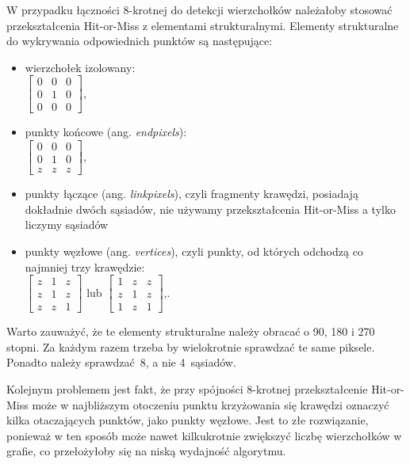 \documentclass[a4paper,11pt,twoside,openright]{report}
\theoremstyle{definition}
\begin{document}
W przypadku łączności 8-krotnej do detekcji wierzchołków należałoby stosować
przekształcenia Hit-or-Miss z elementami strukturalnymi. Elementy strukturalne
do wykrywania odpowiednich punktów są następujące:

\begin{itemize}%
\item wierzchołek izolowany: \\
$
\begin{bmatrix}
0 & 0 & 0 \\
0 & 1 & 0 \\
0 & 0 & 0
\end{bmatrix}
$,
\item punkty końcowe (ang. \textit{endpixels}): \\
$
\begin{bmatrix}
0 & 0 & 0 \\
0 & 1 & 0 \\
z & z & z
\end{bmatrix}
$,
\item punkty łączące (ang. \textit{linkpixels}), czyli fragmenty krawędzi, posiadają
dokładnie dwóch sąsiadów, nie używamy przekształcenia Hit-or-Miss a tylko liczymy sąsiadów
\item punkty węzłowe (ang. \textit{vertices}), czyli punkty, od których odchodzą co najmniej trzy krawędzie: \\
$
\begin{bmatrix}
z & 1 & z \\
z & 1 & z \\
z & z & 1
\end{bmatrix}
$ lub $
\begin{bmatrix}
1 & z & z \\
z & 1 & z \\
1 & z & 1
\end{bmatrix}
$,.
\end{itemize}

Warto zauważyć, że te elementy strukturalne należy obracać o 90, 180 i 270 stopni.
Za każdym razem trzeba by wielokrotnie sprawdzać te same piksele. Ponadto należy
sprawdzać~8, a nie 4~sąsiadów.

Kolejnym problemem jest fakt, że przy spójności 8-krotnej przekształcenie
Hit-or-Miss może w najbliższym otoczeniu punktu krzyżowania się krawędzi oznaczyć
kilka otaczających punktów, jako punkty węzłowe. Jest to złe rozwiązanie, ponieważ
w ten sposób może nawet kilkukrotnie zwiększyć liczbę wierzchołków w grafie, co
przełożyłoby się na niską wydajność algorytmu.
\end{document}
